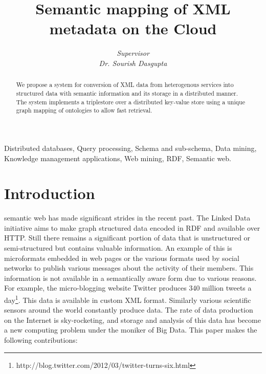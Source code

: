 \documentclass[conference]{IEEEtran}
\begin{document}
%
\title{Semantic mapping of XML metadata on the Cloud}
%
\author{
\emph{Supervisor}\\\emph{Dr. Sourish Dasgupta}
}%
%

\maketitle

\begin{abstract}
    We propose a system for conversion of XML data from heterogenous services
    into structured data with semantic information and its storage in
    a distributed manner. The system implements a triplestore over
    a distributed key-value store using a unique graph mapping of ontologies to
    allow fast retrieval.
\end{abstract}

\begin{IEEEkeywords}
    Distributed databases, Query processing, Schema and sub-schema, Data
    mining, Knowledge management applications, Web mining, RDF, Semantic web.
\end{IEEEkeywords}

\section{Introduction}
 semantic web has made significant strides in the recent
past. The Linked Data initiative aims to make graph structured data encoded in
RDF and available over HTTP. Still there remains a significant portion of data
that is unstructured or semi-structured but contains valuable information. An
example of this is microformats\cite{Khare:06} embedded in web pages or the
various formats used by social networks to publish various messages about the
activity of their members. This information is not available in a semantically
aware form due to various reasons. For example, the micro-blogging website
Twitter produces
340 million tweets
a day\footnote{http://blog.twitter.com/2012/03/twitter-turns-six.html}.
This data is available in custom XML format. Similarly various scientific
sensors around the world constantly produce data. The rate of data
production on the Internet is sky-rocketing, and storage and analysis of
this data has become a new computing problem under the moniker of Big Data.
This paper makes the following contributions:
\end{document}
